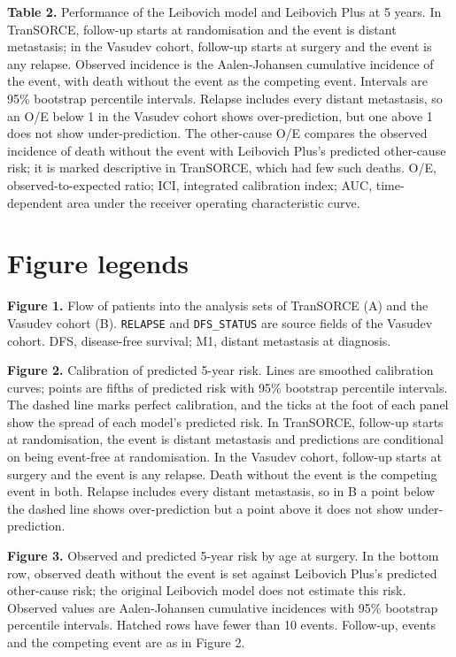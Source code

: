 \documentclass[11pt,a4paper]{article}
\begin{document}
\clearpage
\textbf{Table 2.} Performance of the Leibovich model and Leibovich Plus at 5 years.
In TranSORCE, follow-up starts at randomisation and the event is distant metastasis; in the Vasudev cohort, follow-up starts at surgery and the event is any relapse.
Observed incidence is the Aalen-Johansen cumulative incidence of the event, with death without the event as the competing event.
Intervals are 95\% bootstrap percentile intervals.
Relapse includes every distant metastasis, so an O/E below 1 in the Vasudev cohort shows over-prediction, but one above 1 does not show under-prediction.
The other-cause O/E compares the observed incidence of death without the event with Leibovich Plus's predicted other-cause risk; it is marked descriptive in TranSORCE, which had few such deaths.
O/E, observed-to-expected ratio;
ICI, integrated calibration index;
AUC, time-dependent area under the receiver operating characteristic curve.



\section*{Figure legends}

\textbf{Figure 1.} Flow of patients into the analysis sets of TranSORCE (A) and the Vasudev cohort (B). \texttt{RELAPSE} and \texttt{DFS\_STATUS} are source fields of the Vasudev cohort.
DFS, disease-free survival;
M1, distant metastasis at diagnosis.

\textbf{Figure 2.} Calibration of predicted 5-year risk.
Lines are smoothed calibration curves; points are fifths of predicted risk with 95\% bootstrap percentile intervals.
The dashed line marks perfect calibration, and the ticks at the foot of each panel show the spread of each model's predicted risk.
In TranSORCE, follow-up starts at randomisation, the event is distant metastasis and predictions are conditional on being event-free at randomisation.
In the Vasudev cohort, follow-up starts at surgery and the event is any relapse.
Death without the event is the competing event in both.
Relapse includes every distant metastasis, so in B a point below the dashed line shows over-prediction but a point above it does not show under-prediction.

\textbf{Figure 3.} Observed and predicted 5-year risk by age at surgery.
In the bottom row, observed death without the event is set against Leibovich Plus's predicted other-cause risk; the original Leibovich model does not estimate this risk.
Observed values are Aalen-Johansen cumulative incidences with 95\% bootstrap percentile intervals.
Hatched rows have fewer than 10 events.
Follow-up, events and the competing event are as in Figure 2.
\end{document}
